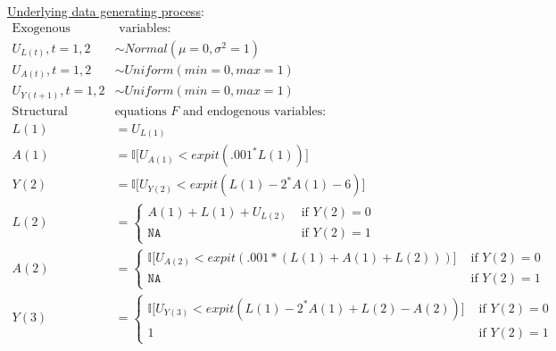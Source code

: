 \documentclass{exam}
\begin{document}
\underline{Underlying data generating process}:
\begin{align*}
\text{Exogenous} & \text{ variables:} \\
U_{L(t)}, t = 1, 2 &\sim Normal(\mu = 0, \sigma^2 = 1) \\
U_{A(t)}, t = 1, 2 &\sim Uniform(min = 0, max = 1) \\
U_{Y(t+1)}, t = 1, 2 & \sim Uniform(min = 0, max = 1) \\
\text{Structural } & \text{equations $F$ and endogenous variables:}  \\
L(1) &= U_{L(1)} \\
A(1) & = \mathbb{I} \big[ U_{A(1)} < expit(.001^*L(1)) \big] \\
Y(2) &= \mathbb{I} \big[U_{Y(2)} < expit(L(1) - 2^*A(1) - 6) \big] \\
L(2) &= 
    \begin{cases}
      A(1) + L(1) + U_{L(2)} & \text{ if } Y(2) = 0\ \\
      \texttt{NA} & \text{ if } Y(2) = 1
    \end{cases} \\
A(2) &= 
    \begin{cases}
      \mathbb{I} \big[ U_{A(2)} < expit(.001*(L(1) + A(1) + L(2))) \big]  & \text{ if } Y(2) = 0\ \\
      \texttt{NA} & \text{ if } Y(2) = 1
    \end{cases} \\
Y(3) &=  
    \begin{cases}
      \mathbb{I} \big[ U_{Y(3)} < expit(L(1) - 2^*A(1) + L(2) - A(2)) \big] & \text{ if } Y(2) = 0\ \\
      1 & \text{ if } Y(2) = 1
    \end{cases} \\
\end{align*}
\end{document}

